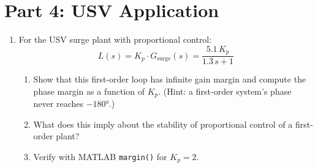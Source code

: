\documentclass[11pt]{article}
\begin{document}
\section*{Part 4: USV Application}

\begin{enumerate}[resume]

\item For the USV surge plant with proportional control:
  \[
    L(s) = K_p \cdot G_{\mathrm{surge}}(s) = \frac{5.1\,K_p}{1.3\,s + 1}
  \]
  \begin{enumerate}
    \item Show that this first-order loop has infinite gain margin and
      compute the phase margin as a function of $K_p$.
      (Hint: a first-order system's phase never reaches $-180°$.)
    \item What does this imply about the stability of proportional control of
      a first-order plant?
    \item Verify with MATLAB \texttt{margin()} for $K_p = 2$.
  \end{enumerate}

\end{enumerate}
\end{document}
